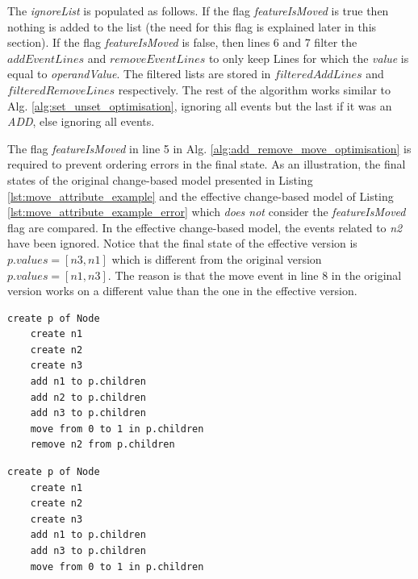 \documentclass[12pt, a4paper]{report} \usepackage[titletoc]{appendix}
\begin{document}
The \emph{ignoreList} is populated as follows. If the flag \emph{featureIsMoved} is true then nothing is added to the list (the need for this flag is explained later in this section). If the flag \emph{featureIsMoved} is false, then lines 6 and 7 filter the $addEventLines$ and $removeEventLines$ to only keep Lines for which the \emph{value} is equal to \emph{operandValue}. The filtered lists are stored in $filteredAddLines$ and $filteredRemoveLines$ respectively. The rest of the algorithm works similar to Alg. \ref{alg:set_unset_optimisation}, ignoring all events but the last if it was an \emph{ADD}, else ignoring all events. 

The flag \emph{featureIsMoved} in line 5 in Alg. \ref{alg:add_remove_move_optimisation} is required to prevent ordering errors in the final state. As an illustration, the final states of the original change-based model presented in Listing  \ref{lst:move_attribute_example} and the effective change-based model of Listing \ref{lst:move_attribute_example_error} which \emph{does not} consider the \emph{featureIsMoved} flag are compared. In the effective change-based model, the events related to \emph{n2} have been ignored. Notice that the final state of the effective version is $p.values = [n3, n1]$  which is different from the original version $p.values = [n1, n3]$. The reason is that the move event in line 8 in the original version works on a different value than the one in the effective version.

\noindent
\begin{minipage}[t]{0.48\linewidth}
	\begin{lstlisting}[style=eol,caption={The change-based persistence representation of reference \emph{children}'s move event.},label=lst:move_attribute_example]
	create p of Node
	create n1
	create n2
	create n3
	add n1 to p.children
	add n2 to p.children
	add n3 to p.children
	move from 0 to 1 in p.children
	remove n2 from p.children
	\end{lstlisting}
\end{minipage}
\hfill
\begin{minipage}[t]{0.48\linewidth}
	\begin{lstlisting}[style=eol,caption={The effective change-based persistence representation of reference \emph{children}'s move event.},label=lst:move_attribute_example_error]
	create p of Node
	create n1
	create n2
	create n3
	add n1 to p.children
	add n3 to p.children
	move from 0 to 1 in p.children
	\end{lstlisting}
\end{minipage}
\end{document}
